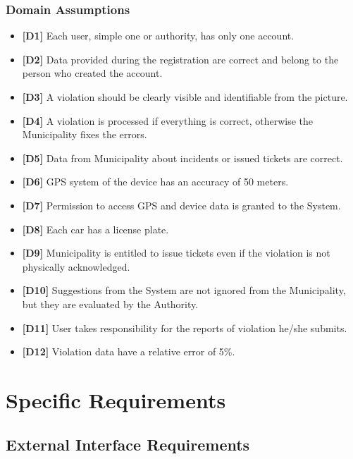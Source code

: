 \documentclass {article}
\begin{document}
		\subsubsection{Domain Assumptions}
		\begin{itemize}
		 \item {\bf [D1]} Each user, simple one or authority, has only one account.
		 \item {\bf [D2]} Data provided during the registration are correct and belong to the person who created the account.
		 \item {\bf [D3]} A violation should be clearly visible and identifiable from the picture.
		 \item {\bf [D4]} A violation is processed if everything is correct, otherwise the Municipality fixes the errors.
		 \item {\bf [D5]} Data from Municipality about incidents or issued tickets are correct.
		 \item {\bf [D6]} GPS system of the device has an accuracy of 50 meters.
		 \item {\bf [D7]} Permission to access GPS and device data is granted to the System.
		 \item {\bf [D8]} Each car has a license plate.
		 \item {\bf [D9]} Municipality is entitled to issue tickets even if the violation is not physically acknowledged.
		 \item {\bf [D10]} Suggestions from the System are not ignored from the Municipality, but they are evaluated by the Authority.
		 \item {\bf [D11]} User takes responsibility for the reports of violation he/she submits. 
		 \item {\bf [D12]} Violation data have a relative error of 5\%.  
		 \end{itemize}
		
\pagebreak

\section{Specific Requirements}
	\subsection{External Interface Requirements}	
\end{document}
